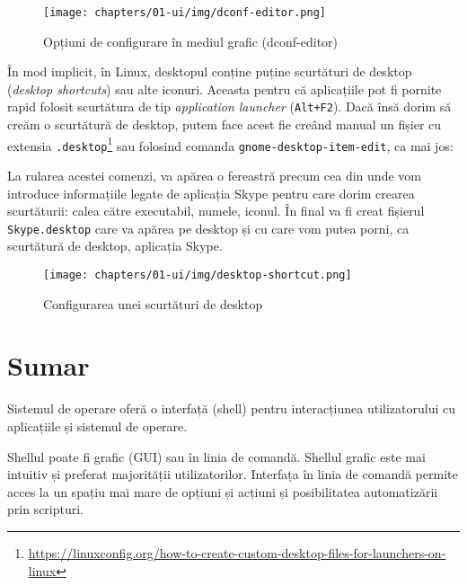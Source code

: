 \begin{figure}[!htbp]
  \centering
  \texttt{[image: chapters/01-ui/img/dconf-editor.png]}
  \caption{Opțiuni de configurare în mediul grafic (dconf-editor)}
  \label{fig:ui:dconf-editor}
\end{figure}

În mod implicit, în Linux, desktopul conține puține scurtături de desktop (\textit{desktop shortcuts}) sau alte iconuri.
Aceasta pentru că aplicațiile pot fi pornite rapid folosit scurtătura de tip \textit{application launcher} (\texttt{Alt+F2}).
Dacă însă dorim să creăm o scurtătură de desktop, putem face acest fie creând manual un fișier cu extensia \texttt{.desktop}\footnote{\url{https://linuxconfig.org/how-to-create-custom-desktop-files-for-launchers-on-linux}} sau folosind comanda \texttt{gnome-desktop-item-edit}, ca mai jos:


La rularea acestei comenzi, va apărea o fereastră precum cea din  unde vom introduce informațiile legate de aplicația Skype pentru care dorim crearea scurtăturii: calea către executabil, numele, iconul.
În final va fi creat fișierul \texttt{Skype.desktop} care va apărea pe desktop și cu care vom putea porni, ca scurtătură de desktop, aplicația Skype.

\begin{figure}[!htbp]
  \centering
  \texttt{[image: chapters/01-ui/img/desktop-shortcut.png]}
  \caption{Configurarea unei scurtături de desktop}
  \label{fig:ui:desktop-shortcut}
\end{figure}

\section{Sumar}
\label{sec:ui:summary}

Sistemul de operare oferă o interfață (shell) pentru interacțiunea utilizatorului cu aplicațiile și sistemul de operare.

Shellul poate fi grafic (GUI) sau în linia de comandă.
Shellul grafic este mai intuitiv și preferat majorității utilizatorilor.
Interfața în linia de comandă permite acces la un spațiu mai mare de opțiuni și acțiuni și posibilitatea automatizării prin scripturi.


